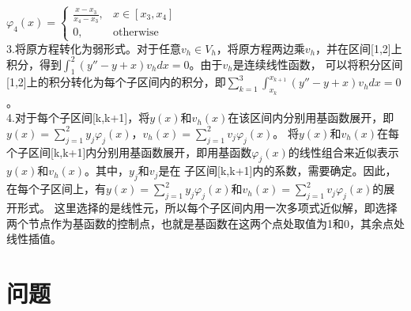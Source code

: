 \documentclass[12pt, a4paper, oneside]{ctexart}
\begin{document}
\begin{spacing}{2.0}
$\varphi_4(x)=\begin{cases}
    \frac{x-x_3}{x_4-x_3}, & x\in[x_3,x_4]\\
    0, & \text{otherwise}
\end{cases}$
\\
3.将原方程转化为弱形式。对于任意$v_h\in V_h$，将原方程两边乘$v_h$，并在区间[1,2]上积分，得到$\int_1^2(y''-y+x)v_hdx=0$。由于$v_h$是连续线性函数，
可以将积分区间[1,2]上的积分转化为每个子区间内的积分，即$\displaystyle\sum_{k=1}^{3}\int_{x_k}^{x_{k+1}}(y''-y+x)v_hdx=0$。
\\
4.对于每个子区间[k,k+1]，将$y(x)$和$v_h(x)$在该区间内分别用基函数展开，即$\displaystyle y(x)=\sum_{j=1}^{2}y_j\varphi_j(x)$，$ \displaystyle v_h(x)=\sum_{j=1}^{2}v_j\varphi_j(x)$。
将$y(x)$和$v_h(x)$在每个子区间[k,k+1]内分别用基函数展开，即用基函数$\varphi_j(x)$的线性组合来近似表示$y(x)$和$v_h(x)$。其中，$y_j$和$v_j$是在
子区间[k,k+1]内的系数，需要确定。因此，在每个子区间上，有$\displaystyle y(x)=\sum_{j=1}^{2}y_j\varphi_j(x)$和$\displaystyle v_h(x)=\sum_{j=1}^{2}v_j\varphi_j(x)$的展开形式。
这里选择的是线性元，所以每个子区间内用一次多项式近似解，即选择两个节点作为基函数的控制点，也就是基函数在这两个点处取值为1和0，其余点处线性插值。

\section{问题}



\end{spacing}{}
\end{document}
